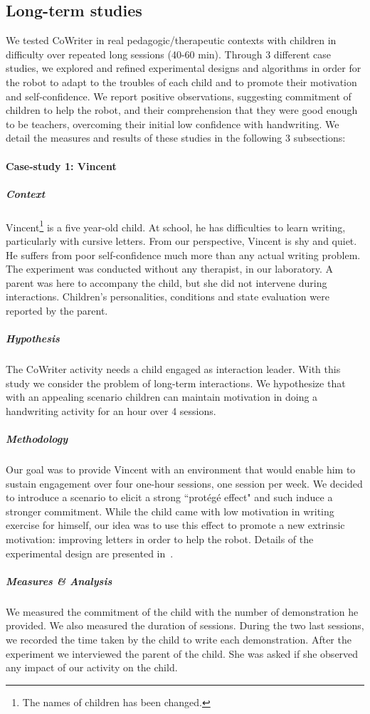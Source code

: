\documentclass[10pt,a4paper]{article}
\begin{document}
\subsection{Long-term studies}\label{long}
We tested CoWriter in real pedagogic/therapeutic contexts with
children in difficulty over repeated long sessions (40-60 min). Through 3 different
case studies, we explored and refined experimental designs and algorithms in
order for the robot to adapt to the
troubles of each child and to promote their motivation and self-confidence. We report positive observations, suggesting commitment of children to help the
robot, and their comprehension that they were good enough to be teachers,
overcoming their initial low confidence with handwriting. We detail the measures and results of these studies in the following 3 subsections:
\paragraph{Case-study 1: Vincent}
\subparagraph{Context}
Vincent\footnote{The names of children has been changed.} is a five year-old child. At school, he has difficulties to learn writing, particularly with cursive letters. From our perspective, Vincent is shy and quiet. He suffers from poor self-confidence much more than any actual writing problem. The experiment was conducted without any therapist, in our laboratory. A parent was here to accompany the child, but she did not intervene during interactions. Children's personalities, conditions and state evaluation were reported by the parent.
\subparagraph{Hypothesis}
The CoWriter activity needs a child engaged as interaction leader. 
With this study we consider the problem of long-term interactions. We hypothesize that with an appealing scenario children can maintain motivation in doing a handwriting activity for an hour over 4 sessions.
\subparagraph{Methodology}
Our goal was to provide Vincent with
an environment that would enable him to sustain engagement over four one-hour sessions, 
one session per week. We decided to introduce a scenario to elicit a strong ``prot\'eg\'e effect" and such induce a stronger commitment. While the child came with low motivation in writing exercise for himself, our idea was to use this effect to promote a new extrinsic motivation: improving letters in order to help the robot. Details of the experimental design are presented in~\cite{jacq2016building}.
\subparagraph{Measures \& Analysis}
We measured the commitment of the child with the number of demonstration he provided. We also measured the duration of sessions. During the two last sessions, we recorded the time taken by the child to write each demonstration. After the experiment we interviewed the parent of the child. She was asked if she observed any impact of our activity on the child.
\end{document}
